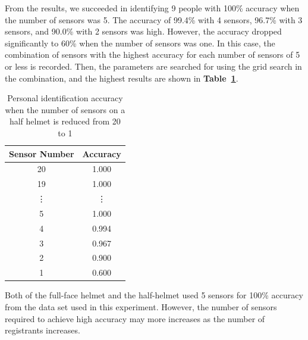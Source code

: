 \documentclass[sigchi,authordraft]{acmart}
\newcommand\tabref[1]{\textbf{Table~\ref{tab:#1}}}
\begin{document}
From the results, we succeeded in identifying 9 people with 100\% accuracy when the number of sensors was 5. The accuracy of 99.4\% with 4 sensors, 96.7\% with 3 sensors, and 90.0\% with 2 sensors was high. However, the accuracy dropped significantly to 60\% when the number of sensors was one. In this case, the combination of sensors with the highest accuracy for each number of sensors of 5 or less is recorded. Then, the parameters are searched for using the grid search in the combination, and the highest results are shown in \tabref{half_num}.\par


\begin{table}[!t]
  \centering
  \caption{Personal identification accuracy when the number of sensors on a half helmet is reduced from 20 to 1}
  \begin{tabular}{c|c} \hline\hline
    Sensor Number & Accuracy \\ \hline
    20 & 1.000 \\
    19 & 1.000 \\
    \vdots & \vdots \\
    5 & 1.000 \\
    4 & 0.994 \\
    3 & 0.967 \\
    2 & 0.900 \\
    1 & 0.600 \\ \hline
  \end{tabular}
  \label{tab:half_num}
\end{table}

Both of the full-face helmet and the half-helmet used 5 sensors for 100\% accuracy from the data set used in this experiment. However, the number of sensors required to achieve high accuracy may more increases as the number of registrants increases.

\end{document}
